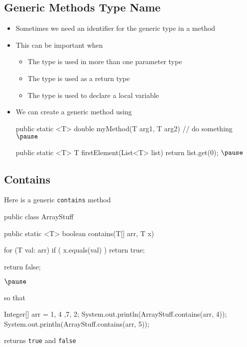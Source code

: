 
\begin{slide}
\section[-1.5]{Generic Methods Type Name}

\begin{PauseHighLight}
  \begin{itemize}
  \item Sometimes we need an identifier for the generic type in a
    method\pause
  \item This can be important when
    \begin{itemize}
    \item The type is used in more than one parameter type
    \item The type is used as a return type
    \item The type is used to declare a local variable\pause
    \end{itemize}
  \item We can create a generic method using
    \begin{java}
      public static <T> double myMethod(T arg1, T arg2) {
        // do something
      }$\pause$

      public static <T> T firstElement(List<T> list) {
        return list.get(0);
      }$\pause$
    \end{java}
  \end{itemize}
\end{PauseHighLight}
\end{slide}


\begin{slide}
\section[-1.5]{Contains}

\begin{PauseHighLight}
Here is a generic \texttt{contains} method
\begin{java}
public class ArrayStuff
{
    public static <T> boolean contains(T[] arr, T x)
    {
        for (T val: arr)
            if ( x.equals(val) )
                return true;
        
        return false;
    }
}$\pause$
\end{java}
so that
\begin{java}
        Integer[] arr = {1, 4 ,7, 2};
        System.out.println(ArrayStuff.contains(arr, 4));
        System.out.println(ArrayStuff.contains(arr, 5));  
\end{java}
returns \texttt{true} and \texttt{false} \pause
\end{PauseHighLight}
\end{slide}


